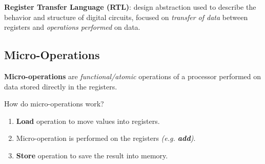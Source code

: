 \documentclass[12pt, letterpaper]{article}
\begin{document}
\textbf{Register Transfer Language (RTL)}: design abstraction used to describe the behavior and structure of digital circuits, focused on \textit{transfer of data} between registers and \textit{operations performed} on data.
\medskip

\subsection*{Micro-Operations} \label{microoperations}
\textbf{Micro-operations} are \textit{functional/atomic} operations of a processor performed on data stored directly in the registers.
\medskip

How do micro-operations work?
\begin{enumerate}
    \item \textbf{Load} operation to move values into registers.
    \item Micro-operation is performed on the registers \textit{(e.g. \textbf{add})}.
    \item \textbf{Store} operation to save the result into memory.
\end{enumerate}
\end{document}

